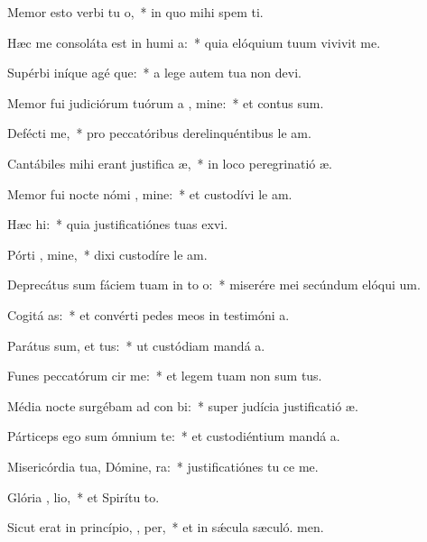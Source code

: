 \item Memor esto verbi tu  o,~* in quo mihi spem ti.
\item Hæc me consoláta est in humi a:~* quia elóquium tuum vivivit me.
\item Supérbi iníque agé que:~* a lege autem tua non devi.
\item Memor fui judiciórum tuórum a , mine:~* et contus sum.
\item Defécti  me,~* pro peccatóribus derelinquéntibus le am.
\item Cantábiles mihi erant justifica æ,~* in loco peregrinatió æ.
\item Memor fui nocte nómi , mine:~* et custodívi le am.
\item Hæc   hi:~* quia justificatiónes tuas exvi.
\item Pórti , mine,~* dixi custodíre le am.
\item Deprecátus sum fáciem tuam in to  o:~* miserére mei secúndum elóqui um.
\item Cogitá  as:~* et convérti pedes meos in testimóni a.
\item Parátus sum, et   tus:~* ut custódiam mandá a.
\item Funes peccatórum cir  me:~* et legem tuam non sum tus.
\item Média nocte surgébam ad con bi:~* super judícia justificatió æ.
\item Párticeps ego sum ómnium  te:~* et custodiéntium mandá a.
\item Misericórdia tua, Dómine,   ra:~* justificatiónes tu ce me.
\item Glória ,  lio,~* et Spirítu to.
\item Sicut erat in princípio,  ,  per,~* et in sǽcula sæculó. men.
